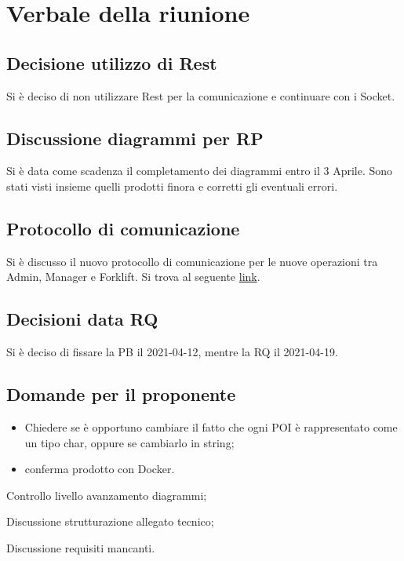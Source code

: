 \section{Verbale della riunione}

\subsection{Decisione utilizzo di Rest}
Si è deciso di non utilizzare Rest per la comunicazione e continuare con i Socket.

\subsection{Discussione diagrammi per RP}
Si è data come scadenza il completamento dei diagrammi entro il 3 Aprile.
Sono stati visti insieme quelli prodotti finora e corretti gli eventuali errori.

\subsection{Protocollo di comunicazione}
Si è discusso il nuovo protocollo di comunicazione per le nuove operazioni tra Admin, Manager e Forklift.
Si trova al seguente \href{https://threewaymilkshake.atlassian.net/wiki/spaces/PORTACS/pages/237764625/Collegamento+NodeJs+Java}{link}.

\subsection{Decisioni data RQ}
Si è deciso di fissare la PB il 2021-04-12, mentre la RQ il 2021-04-19.

\subsection{Domande per il proponente}
\begin{itemize}
	\item Chiedere se è opportuno cambiare il fatto che ogni POI è rappresentato come un tipo char, oppure se cambiarlo in string;
	\item conferma prodotto con Docker.
\end{itemize}



	\item Controllo livello avanzamento diagrammi;
\item Discussione strutturazione allegato tecnico;
\item Discussione requisiti mancanti.

